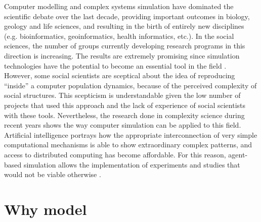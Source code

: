 \documentclass{report}
\begin{document}
Computer modelling and complex systems simulation have dominated the scientific debate over the last decade, providing important outcomes in biology, geology and life sciences, and resulting in the birth of entirely new disciplines (e.g. bioinformatics, geoinformatics, health informatics, etc.). In the social sciences, the number of groups currently developing research programs in this direction is increasing. The results are extremely promising since simulation technologies have the potential to become an essential tool in the field \cite{Gilbert2008}.\\
However, some social scientists are sceptical about the idea of reproducing “inside” a computer population dynamics, because of the perceived complexity of social structures. This scepticism is understandable given the low number of projects that used this approach and the lack of experience of social scientists with these tools. Nevertheless, the research done in complexity science during recent years shows the way computer simulation can be applied to this field. Artificial intelligence portrays how the appropriate interconnection of very simple computational mechanisms is able to show extraordinary complex patterns, and access to distributed computing has become affordable. For this reason, agent-based simulation allows the implementation of experiments and studies that would not be viable otherwise \cite{Pavon2008}. \\

\section{Why model}
\end{document}
